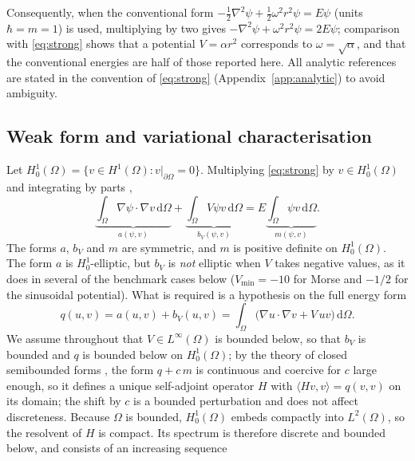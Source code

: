 \documentclass[pdflatex,sn-mathphys-num]{sn-jnl}
\theoremstyle{thmstyleone}%
\theoremstyle{thmstyletwo}%
\theoremstyle{thmstylethree}%
\begin{document}
Consequently, when the conventional form
$-\tfrac12\nabla^2\psi + \tfrac12\omega^2 r^2\psi = E\psi$ (units $\hbar = m = 1$)
is used, multiplying by two gives $-\nabla^2\psi + \omega^2r^2\psi = 2E\psi$;
comparison with \eqref{eq:strong} shows that a potential $V = \alpha r^2$
corresponds to $\omega = \sqrt{\alpha}$, and that the conventional energies are
half of those reported here. All analytic references are stated in the convention of \eqref{eq:strong}
(Appendix~\ref{app:analytic}) to avoid ambiguity.

\subsection{Weak form and variational characterisation}

Let $H^1_0(\Omega) = \{ v \in H^1(\Omega) : v|_{\partial\Omega} = 0 \}$.
Multiplying \eqref{eq:strong} by $v \in H^1_0(\Omega)$ and integrating by
parts \cite{strang1973,boffi2010},
%
\begin{equation}\label{eq:weak}
  \underbrace{\int_\Omega \nabla\psi\cdot\nabla v \,\mathrm{d}\Omega}_{a(\psi,v)}
  + \underbrace{\int_\Omega V\psi v \,\mathrm{d}\Omega}_{b_V(\psi,v)}
  = E \underbrace{\int_\Omega \psi v \,\mathrm{d}\Omega}_{m(\psi,v)} .
\end{equation}
%
The forms $a$, $b_V$ and $m$ are symmetric, and $m$ is positive definite on
$H^1_0(\Omega)$. The form $a$ is $H^1_0$-elliptic, but $b_V$ is \emph{not}
elliptic when $V$ takes negative values, as it does in several of the benchmark
cases below ($V_{\min} = -10$ for Morse and $-1/2$ for the sinusoidal potential).
What is required is a hypothesis on the full energy form
%
\begin{equation}\label{eq:qform}
  q(u,v) = a(u,v) + b_V(u,v) = \int_\Omega
  \bigl(\nabla u\cdot\nabla v + V\,uv\bigr)\,\mathrm{d}\Omega .
\end{equation}
%
We assume throughout that $V \in L^\infty(\Omega)$ is bounded below, so that
$b_V$ is bounded and $q$ is bounded below on $H^1_0(\Omega)$; by the
theory of closed semibounded forms \cite{courant1953,boffi2010}, the form $q + c\,m$ is
continuous and coercive for $c$ large enough, so it defines a unique
self-adjoint operator $H$ with $\langle Hv,v\rangle = q(v,v)$ on its domain; the
shift by $c$ is a bounded perturbation and does not affect discreteness. Because
$\Omega$ is bounded, $H^1_0(\Omega)$ embeds compactly into $L^2(\Omega)$, so the
resolvent of $H$ is compact. Its spectrum is therefore discrete and bounded
below, and consists of an increasing sequence
\end{document}
